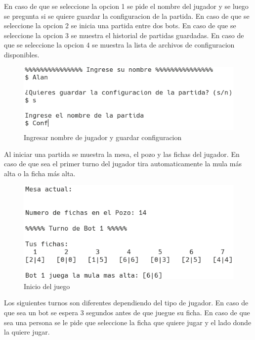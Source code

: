 \documentclass[12pt]{article}
\begin{document}
  En caso de que se seleccione la opcion 1 se pide el nombre del jugador y se luego se pregunta si se quiere guardar la configuracion de la partida. En caso de que se seleccione la opcion 2 se inicia una partida entre dos bots. En caso de que se seleccione la opcion 3 se muestra el historial de partidas guardadas. En caso de que se seleccione la opcion 4 se muestra la lista de archivos de configuracion disponibles.

  \begin{figure}[h!]
    \centering
    \includegraphics[]{pf2.png}
    \caption{Ingresar nombre de jugador y guardar configuracion}
  \end{figure}

  Al iniciar una partida se muestra la mesa, el pozo y las fichas del jugador. En caso de que sea el primer turno del jugador tira automaticamente la mula más alta o la ficha más alta. 

  \begin{figure}[h!]
    \centering
    \includegraphics{pf3.png}
    \caption{Inicio del juego}
  \end{figure}
  
  Los siguientes turnos son diferentes dependiendo del tipo de jugador. En caso de que sea un bot se espera 3 segundos antes de que juegue su ficha. En caso de que sea una persona se le pide que seleccione la ficha que quiere jugar y el lado donde la quiere jugar.
\end{document}
